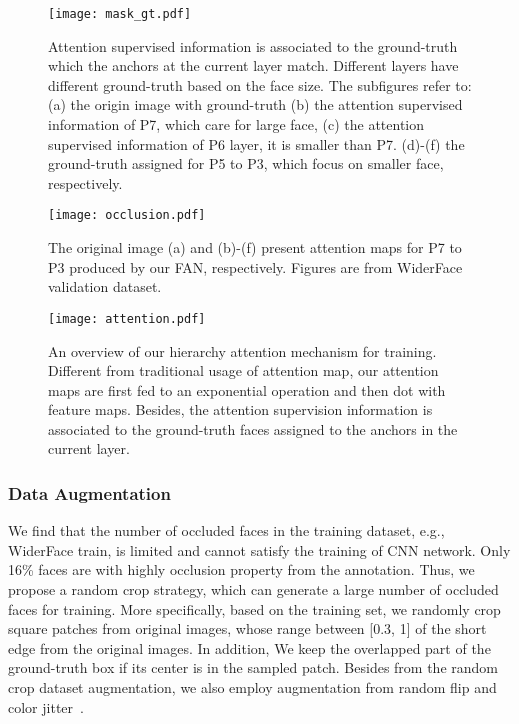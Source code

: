 \documentclass[10pt,twocolumn,letterpaper]{article}
\begin{document}
\begin{figure}[t]
\begin{center}
    \texttt{[image: mask\_gt.pdf]}
\end{center}
    \vskip -2cm
    \caption{Attention supervised information is associated to the ground-truth which the anchors at the current layer match. Different layers have different ground-truth based on the face size. The subfigures refer to: (a) the origin image with ground-truth (b) the attention supervised information of P7, which care for large face, (c) the attention supervised information of P6 layer, it is smaller than P7. (d)-(f) the ground-truth assigned for P5 to P3, which focus on smaller face, respectively.}
\label{fig:attention_gt}
\end{figure}

\begin{figure}[t]
\begin{center}
    \texttt{[image: occlusion.pdf]}
\end{center}
    \caption{The original image (a) and (b)-(f) present attention maps for P7 to P3 produced by our FAN, respectively. Figures are from WiderFace validation dataset.} 
\label{fig:occlusion_attention}
\end{figure}

\begin{figure*}[h]
\begin{center}
    \texttt{[image: attention.pdf]}
\end{center}
    \caption{An overview of our hierarchy attention mechanism for training. Different from traditional usage of attention map, our attention maps are first fed to an exponential operation and then dot with feature maps. Besides, the attention supervision information is associated to the ground-truth faces assigned to the anchors in the current layer.}
\label{fig:hierarchy_attetion}
\end{figure*}


\subsubsection{Data Augmentation\label{sec:data_aug}}
We find that the number of occluded faces in the training dataset, e.g., WiderFace train, is limited and cannot satisfy the training of CNN network.
Only 16\% faces are with highly occlusion property from the annotation. Thus, we propose a random crop strategy, which can generate a large number of occluded faces for training. More specifically, based on the training set,  we randomly crop square patches from original images, whose range between [0.3, 1] of the short edge from the original images. In addition, We keep the overlapped part of the ground-truth box if its center is in the sampled patch. Besides from the random crop dataset augmentation, we also employ augmentation from random flip and color jitter~\cite{zhang2017s3fd}.
\end{document}
